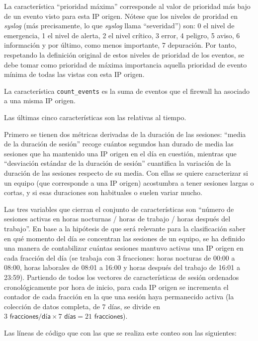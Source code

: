 La característica ``prioridad máxima'' corresponde al valor de prioridad más bajo de un evento visto para esta IP origen.
Nótese que los niveles de proridad en \emph{syslog} (más precisamente, lo que \emph{syslog} llama ``severidad'') son:
0 el nivel de emergencia, 1 el nivel de alerta, 2 el nivel crítico, 3 error, 4 peligro, 5 aviso, 6 información y por último, como menos importante, 7 depuración.
Por tanto, respetando la definición original de estos niveles de prioridad de los eventos,
se debe tomar como prioridad de máxima importancia aquella prioridad de evento mínima de todas las vistas con esta IP origen.

La característica \texttt{count\_events} es la suma de eventos que el firewall ha asociado a una misma IP origen.

Las últimas cinco características son las relativas al tiempo.

Primero se tienen dos métricas derivadas de la duración de las sesiones:
``media de la duración de sesión'' recoge cuántos segundos han durado de media las sesiones que ha mantenido una IP origen en el día en cuestión,
mientras que ``desviación estándar de la duración de sesión'' cuantifica la variación de la duración de las sesiones respecto de su media.
Con ellas se quiere caracterizar si un equipo (que corresponde a una IP origen) acostumbra a tener sesiones largas o cortas,
y si esas duraciones son habituales o suelen variar mucho.

Las tres variables que cierran el conjunto de características son ``número de sesiones activas en horas nocturnas / horas de trabajo / horas después del trabajo''.
En base a la hipótesis de que será relevante para la clasificación saber en qué momento del día se concentran las sesiones de un equipo,
se ha definido una manera de contabilizar cuántas sesiones mantuvo activas una IP origen en cada fracción del día
(se trabaja con 3 fracciones: horas nocturas de 00:00 a 08:00, horas laborales de 08:01 a 16:00 y horas después del trabajo de 16:01 a 23:59).
Partiendo de todos los vectores de características de sesión ordenados cronológicamente por hora de inicio,
para cada IP origen se incrementa el contador de cada fracción en la que una sesión haya permanecido activa
(la colección de datos completa, de 7 días, se divide en $3\textsf{ fracciones/día} \times 7\textsf{ días} = 21\textsf{ fracciones}$).

Las líneas de código que con las que se realiza este conteo son las siguientes:

